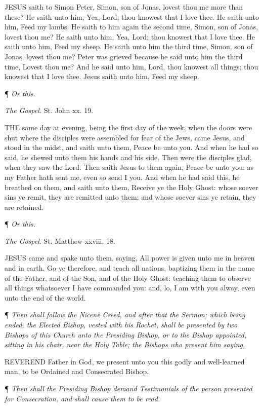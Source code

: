 JESUS
saith to Simon Peter, Simon, son of Jonas, lovest thou me more than these?
He saith unto him, Yea, Lord; thou knowest that I love thee. He saith
unto him, Feed my lambs. He saith to him again the second time, Simon,
son of Jonas, lovest thou me? He saith unto him, Yea, Lord; thou knowest
that I love thee. He saith unto him, Feed my sheep. He saith unto him
the third time, Simon, son of Jonas, lovest thou me? Peter was grieved
because he said unto him the third time, Lovest thou me? And he said unto
him, Lord, thou knowest all things; thou knowest that I love thee. Jesus
saith unto him, Feed my sheep.

¶ \emph{Or this.}

\emph{The Gospel.} St. John xx. 19.

THE same day at evening,
being the first day of the week, when the doors were shut where the disciples
were assembled for fear of the Jews, came Jesus, and stood in the midst,
and saith unto them, Peace be unto you. And when he had so said, he shewed
unto them his hands and his side. Then were the disciples glad, when they
saw the Lord. Then saith Jesus to them again, Peace be unto you: as my
Father hath sent me, even so send I you. And when he had said this, he
breathed on them, and saith unto them, Receive ye the Holy Ghost: whose
soever sins ye remit, they are remitted unto them; and whose soever sins
ye retain, they are retained.

¶ \emph{Or this.}

\emph{The Gospel}. St. Matthew xxviii. 18.

JESUS came and spake unto
them, saying, All power is given unto me in heaven and in earth. Go ye
therefore, and teach all nations, baptizing them in the name of the Father,
and of the Son, and of the Holy Ghost: teaching them to observe all things
whatsoever I have commanded you: and, lo, I am with you alway, even unto
the end of the world.

¶ \emph{Then shall follow
the Nicene Creed, and after that the Sermon; which being ended, the Elected
Bishop, vested with his Rochet, shall be presented by two Bishops of this
Church unto the Presiding Bishop, or to the Bishop appointed, sitting
in his chair, near the Holy Table; the Bishops who present him saying,}

REVEREND Father in God,
we present unto you this godly and well-learned man, to be Ordained and
Consecrated Bishop.

¶ \emph{Then shall the
Presiding Bishop demand Testimonials of the person presented for Consecration,
and shall cause them to be read.}

